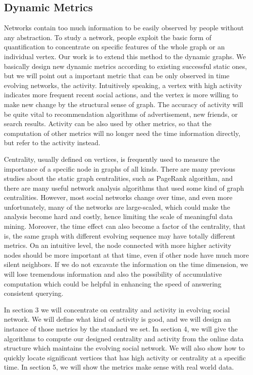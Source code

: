 \documentclass[12pt,abstract=true]{scrartcl}
\numberwithin{equation}{section}
\theoremstyle{definition}   \newtheorem{definition}{Definition}[section]
\theoremstyle{plain}        \newtheorem{theorem}{Theorem}[section]
\theoremstyle{plain}        \newtheorem{observation}{Observation}[section]
\theoremstyle{plain}        \newtheorem{fact}{Fact}[section]
\theoremstyle{plain}        \newtheorem{claim}{Claim}[section]
\theoremstyle{plain}        \newtheorem{lemma}[theorem]{Lemma}
\theoremstyle{plain}        \newtheorem{corollary}[theorem]{Corollary}
\theoremstyle{remark}       \newtheorem{example}{Example}[section]
\theoremstyle{remark}       \newtheorem{remark}{Remark}[section]
\begin{document}
\subsection{Dynamic Metrics}
Networks contain too much information to be easily observed by people without
any abstraction. To study a network, people exploit the basic form of
quantification to concentrate on specific features of the whole graph or an
individual vertex. Our work is to extend this method to the dynamic graphs. We
basically design new dynamic metrics according to existing successful static
ones, but we will point out a important metric that can be only observed in
time evolving networks, the activity. Intuitively speaking, a vertex with high
activity indicates more frequent recent social actions, and the vertex is more
willing to make new change by the structural sense of graph. The accuracy of
activity will be quite vital to recommendation algorithms of advertisement, new
friends, or search results. Activity can be also used by other metrics, so that
the computation of other metrics will no longer need the time information
directly, but refer to the activity instead.

Centrality, usually defined on vertices, is frequently used to measure the
importance of a specific node in graphs of all kinds. There are many previous
studies about the static graph centralities\cite{newman2010networks}, such as
PageRank algorithm\cite{page1999pagerank}, and there are many useful network
analysis algorithms that used some kind of graph centralities. However, most
social networks change over time, and even more unfortunately, many of the
networks are large-scaled, which could make the analysis become hard and
costly, hence limiting the scale of meaningful data mining. Moreover, the time
effect can also become a factor of the centrality, that is, the same graph with
different evolving sequence may have totally different metrics. On an intuitive
level, the node connected with more higher activity nodes should be more
important at that time, even if other node have much more silent neighbors. If
we do not excavate the information on the time dimension, we will lose
tremendous information and also the possibility of accumulative computation
which could be helpful in enhancing the speed of answering consistent
querying.

In section 3 we will concentrate on centrality and activity in evolving social
network. We will define what kind of activity is good, and we will design
an instance of those metrics by the standard we set. In section 4, we will
give the algorithms to compute our designed centrality and activity from the
online data structure which maintains the evolving social network. We will also
show how to quickly locate significant vertices that has high activity or
centrality at a specific time. In section 5, we will show the metrics make
sense with real world data.
\end{document}
